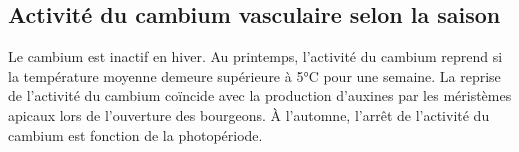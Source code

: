 \subsection{Activité du cambium vasculaire selon la saison}

Le cambium est inactif en hiver. Au printemps, l'activité du cambium reprend si la température moyenne demeure supérieure à 5°C pour une semaine. La reprise de l'activité du cambium coïncide avec la production d'auxines par les méristèmes apicaux lors de l'ouverture des bourgeons. À l'automne, l'arrêt de l'activité du cambium est fonction de la photopériode.
%
%
%
